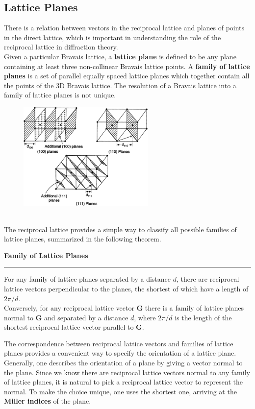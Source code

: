 \documentclass[10.75pt,a4paper,openright,bottom=2cm]{article}
\renewcommand{\Vec}[1]{\boldsymbol{#1}}
\begin{document}
\subsection{Lattice Planes}
There is a relation between vectors in the reciprocal lattice and planes of points in the direct lattice, which is important in understanding the role of the reciprocal lattice in diffraction theory.\\
Given a particular Bravais lattice, a \textbf{lattice plane} is defined to be any plane containing at least three non-collinear Bravais lattice points. A \textbf{family of lattice planes} is a set of parallel equally spaced lattice planes which together contain all the points of the 3D Bravais lattice. The resolution of a Bravais lattice into a family of lattice planes is not unique.
\begin{figure}[h!]
    \centering
    \includegraphics[width=0.6\textwidth]{lattice_planes.png}
     
    \label{fig:lattice_planes}
\end{figure}\\
\noindent
The reciprocal lattice provides a simple way to classify all possible families of lattice planes, summarized in the following theorem.
\begin{mybox}
\textbf{Family of Lattice Planes}
\hrule
\vspace{0.15cm}
For any family of lattice planes separated by a distance $d$, there are reciprocal lattice vectors perpendicular to the planes, the shortest of which have a length of $2\pi/d$.\\
Conversely, for any reciprocal lattice vector $\Vec{G}$ there is a family of lattice planes normal to $\Vec{G}$ and separated by a distance $d$, where $2\pi/d$ is the length of the shortest reciprocal lattice vector parallel to $\Vec{G}$.
\end{mybox}
\noindent
The correspondence between reciprocal lattice vectors and families of lattice planes provides a convenient way to specify the orientation of a lattice plane. Generally, one describes the orientation of a plane by giving a vector normal to the plane. Since we know there are reciprocal lattice vectors normal to any family of lattice planes, it is natural to pick a reciprocal lattice vector to represent the normal. To make the choice unique, one uses the shortest one, arriving at the \textbf{Miller indices} of the plane.
\end{document}
